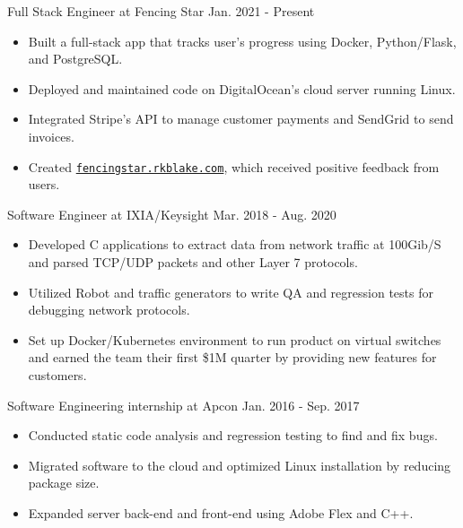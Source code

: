 \documentclass[line,margin]{res}
\begin{document}
\begin{resume}
Full Stack Engineer at Fencing Star
\hfill Jan. 2021 - Present
\begin{itemize} \itemsep -2pt
	\item Built a full-stack app that tracks user’s progress using Docker, Python/Flask, and PostgreSQL.
	\item Deployed and maintained code on DigitalOcean’s cloud server running Linux.
	\item Integrated Stripe’s API to manage customer payments and SendGrid to send invoices.
	\item Created \href{https://fencingstar.rkblake.com}{\texttt{fencingstar.rkblake.com}}, which received positive feedback from users.
\end{itemize}
\vspace{-6pt}
Software Engineer at IXIA/Keysight
\hfill Mar. 2018 - Aug. 2020
	\begin{itemize} \itemsep -2pt
	\item Developed C applications to extract data from network traffic at 100Gib/S and parsed TCP/UDP packets and other Layer 7 protocols.
	\item Utilized Robot and traffic generators to write QA and regression tests for debugging network protocols.
	\item Set up Docker/Kubernetes environment to run product on virtual switches and earned the team their first \$1M quarter by providing new features for customers.
	\end{itemize}
\vspace{-6pt}
Software Engineering internship at Apcon
\hfill  Jan. 2016 - Sep. 2017
\begin{itemize} \itemsep -2pt
	\item Conducted static code analysis and regression testing to find and fix bugs.
	\item Migrated software to the cloud and optimized Linux installation by reducing package size.
	\item Expanded server back-end and front-end using Adobe Flex and C++.

	\end{itemize}


\end{resume}
\end{document}
